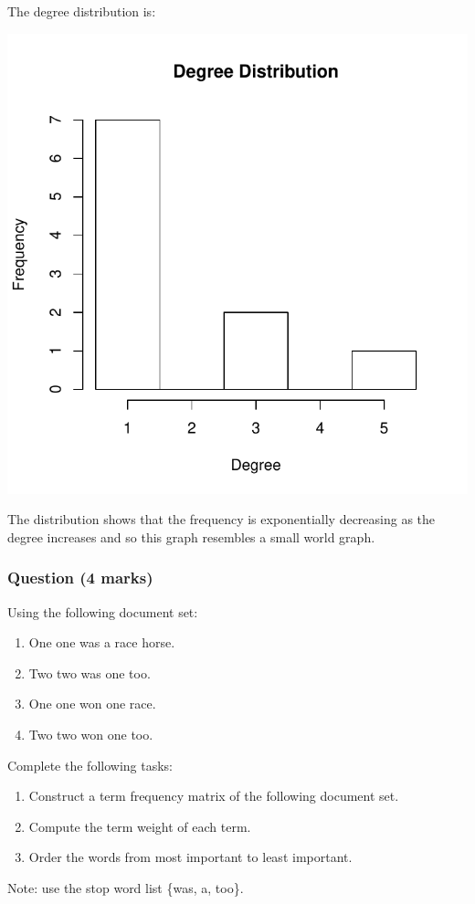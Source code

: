 \documentclass[a4paper,oneside]{book}
\begin{document}
The degree distribution is:
\begin{center}
\includegraphics{bnetwork-dist}
\end{center}

The distribution shows that the frequency is exponentially decreasing
as the degree increases and so this graph resembles a small world
graph.


\subsubsection*{Question (4 marks)}

Using the following document set:
\begin{enumerate}
\item One one was a race horse.
\item Two two was one too.
\item One one won one race.
\item Two two won one too.
\end{enumerate}
Complete the following tasks:
\begin{enumerate}
\item Construct a term frequency matrix of the following document set.
\item Compute the term weight of each term.
\item Order the words from most important to least important.
\end{enumerate}
Note: use the stop word list \{was, a, too\}.
\end{document}
